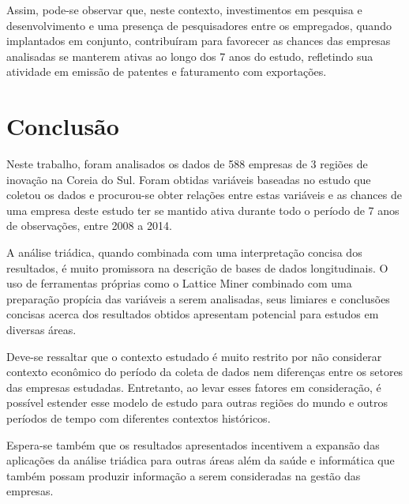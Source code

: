 \documentclass[12pt]{article}
\begin{document}
Assim, pode-se observar que, neste contexto, investimentos em pesquisa e desenvolvimento e uma presença de pesquisadores entre os empregados, quando implantados em conjunto, contribuíram para favorecer as chances das empresas analisadas se manterem ativas ao longo dos 7 anos do estudo, refletindo sua atividade em emissão de patentes e faturamento com exportações.

\section{Conclusão}

Neste trabalho, foram analisados os dados de 588 empresas de 3 regiões de inovação na Coreia do Sul. Foram obtidas variáveis baseadas no estudo que coletou os dados e procurou-se obter relações entre estas variáveis e as chances de uma empresa deste estudo ter se mantido ativa durante todo o período de 7 anos de observações, entre 2008 a 2014.

A análise triádica, quando combinada com uma interpretação concisa dos resultados, é muito promissora na descrição de bases de dados longitudinais. O uso de ferramentas próprias como o Lattice Miner combinado com uma preparação propícia das variáveis a serem analisadas, seus limiares e conclusões concisas acerca dos resultados obtidos apresentam potencial para estudos em diversas áreas.

Deve-se ressaltar que o contexto estudado é muito restrito por não considerar contexto econômico do período da coleta de dados nem diferenças entre os setores das empresas estudadas. Entretanto, ao levar esses fatores em consideração, é possível estender esse modelo de estudo para outras regiões do mundo e outros períodos de tempo com diferentes contextos históricos.

Espera-se também que os resultados apresentados incentivem a expansão das aplicações da análise triádica para outras áreas além da saúde e informática que também possam produzir informação a serem consideradas na gestão das empresas.



\end{document}

